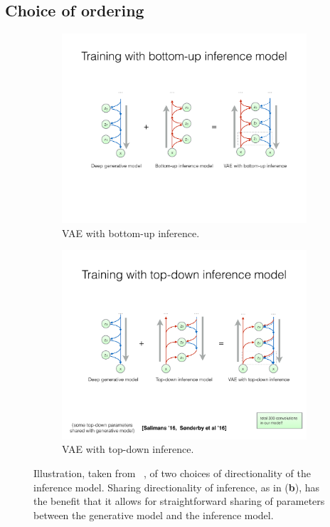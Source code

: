 \documentclass[MAL,biber]{nowfnt} %
\begin{document}
\subsection{Choice of ordering}

\begin{figure}[t!]
	\centering
	\begin{subfigure}[]{0.99\textwidth}
		\centering
		\includegraphics[width=.99\textwidth]{figures/direction_up.pdf}
		\caption{VAE with bottom-up inference.
		}
	\end{subfigure}%
	\vspace{5mm}
	\begin{subfigure}[]{0.99\textwidth}
		\centering
		\includegraphics[width=.99\textwidth]{figures/direction_down.pdf}
		\caption{VAE with top-down inference.}
	\end{subfigure}%
	\vspace{5mm}
	\caption{Illustration, taken from ~\cite{kingma2016improving}, of two choices of directionality of the inference model. Sharing directionality of inference, as in (\textbf{b}), has the benefit that it allows for straightforward sharing of parameters between the generative model and the inference model.}
	\label{fig:ordering}
\end{figure}
\end{document}
